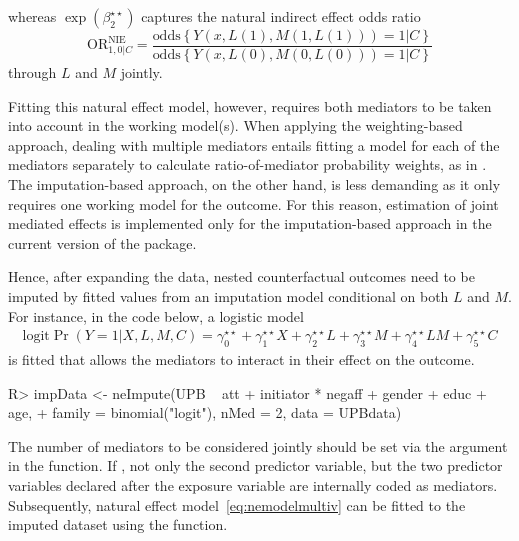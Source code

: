 \documentclass[nojss]{jss}
\begin{document}
whereas $\exp(\beta_2^{\star\star})$ captures the natural indirect effect odds ratio
$$
\mbox{OR}^{\text{NIE}}_{1,0|C} = \frac{\mbox{odds}\left\{Y(x,L(1),M(1, L(1)))=1|C\right\}}{\mbox{odds}\left\{Y(x,L(0),M(0, L(0)))=1|C\right\}}
$$ 
through $L$ and $M$ jointly.
\par Fitting this natural effect model, however, requires both mediators to be taken into account in the working model(s). When applying the weighting-based approach, dealing with multiple mediators entails fitting a model for each of the mediators separately to calculate ratio-of-mediator probability weights, as in \cite{Lange2013a}. The imputation-based approach, on the other hand, is less demanding as it only requires one working model for the outcome. For this reason, estimation of joint mediated effects is implemented only for the imputation-based approach in the current version of the  package.
\par Hence, after expanding the data, nested counterfactual outcomes need to be imputed by fitted values from an imputation model conditional on both $L$ and $M$. For instance, in the  code below, a logistic model
\begin{align*}
\mbox{logit} \Pr(Y=1|X,L,M,C) = \gamma^{\star\star}_0 + \gamma^{\star\star}_1 X + \gamma^{\star\star}_2 L + \gamma^{\star\star}_3 M + \gamma^{\star\star}_4 LM + \gamma^{\star\star}_5 C
\end{align*}
is fitted that allows the mediators to interact in their effect on the outcome.
\begin{Schunk}
\begin{Sinput}
R> impData <- neImpute(UPB ~ att + initiator * negaff + gender + educ + age,
+    family = binomial("logit"), nMed = 2, data = UPBdata)
\end{Sinput}
\end{Schunk}
The number of mediators to be considered jointly should be set via the  argument in the  function. If , not only the second predictor variable, but the two predictor variables declared after the exposure variable are internally coded as mediators. Subsequently, natural effect model~\eqref{eq:nemodelmultiv} can be fitted to the imputed dataset using the  function.
\end{document}
